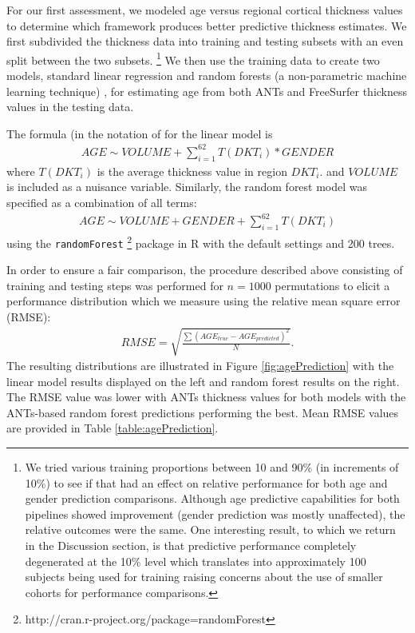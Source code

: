For our first assessment, we modeled age versus regional cortical thickness values 
to determine which framework produces better predictive thickness estimates.  We first
subdivided the thickness data into training and testing subsets with an even split
between the two subsets.%
\footnote{
We tried various training proportions between 10 and 90\% (in increments of 10\%)
to see if that had an effect on relative performance for both age and 
gender prediction comparisons. Although age predictive capabilities for 
both pipelines showed improvement (gender prediction was mostly unaffected), 
the relative outcomes were the same.  
One interesting result, to which we return in the Discussion section, 
is that predictive performance completely degenerated at the 10\% level
which translates into approximately 100 subjects being used for training
raising concerns about the use of smaller cohorts for performance comparisons.
}
We then use the training data to create two models, standard linear regression
and random forests (a non-parametric machine learning technique) \cite{breiman2001},
for estimating age from both ANTs and FreeSurfer thickness values in the testing data.  

The formula (in the notation of \cite{wilkinson1973} for the linear model is
\begin{align}
  AGE \sim VOLUME + \sum_{i=1}^{62} T(DKT_{i})*GENDER
\end{align}
where $T(DKT_{i})$ is the average thickness value in region $DKT_{i}$.
and $VOLUME$ is included as a nuisance variable.  Similarly, the random forest 
model was specified as a combination of all terms: 
\begin{align}
  AGE \sim VOLUME + GENDER + \sum_{i=1}^{62} T(DKT_{i})
\end{align}
using the {\tt randomForest}%
\footnote{
http://cran.r-project.org/package=randomForest
}
package in R with the default settings and 200 trees.

In order to ensure a fair comparison, the procedure described above consisting
of training and testing steps was performed for $n = 1000$ permutations to elicit a 
performance distribution which we measure using the relative mean square
error (RMSE):
\begin{align}
  RMSE = \sqrt{\frac{\sum \left(AGE_{true} - AGE_{predicted} \right)^2}{N}}.
\end{align}
The resulting distributions are illustrated in Figure \ref{fig:agePrediction}
with the linear model results displayed on the left and random forest results
on the right.  The RMSE value was lower with ANTs thickness values for both 
models with the ANTs-based random forest predictions performing the best.  
Mean RMSE values are provided in Table \ref{table:agePrediction}.

